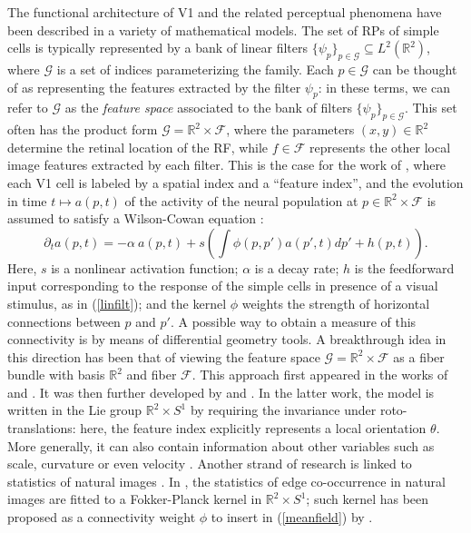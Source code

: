 \documentclass[11pt,oneside,reqno]{amsart}
\begin{document}
 The functional architecture of V1 and the related perceptual phenomena have been described in a variety of mathematical models. The set of RPs of simple cells is typically represented by a bank of linear filters $\{\psi_p\}_{p \in \mathcal{G}} \subseteq L^2(\mathbb{R}^2)$, where $\mathcal{G}$ is a set of indices parameterizing the family. Each $p \in \mathcal{G}$ can be thought of as representing the features extracted by the filter $\psi_p$: in these terms, we can refer to $\mathcal{G}$ as the \emph{feature space} associated to the bank of filters $\{\psi_p\}_{p \in \mathcal{G}}$. This set often has the product form $\mathcal{G}=\mathbb{R}^2\times\mathcal{F}$, where the parameters $(x,y) \in\mathbb{R}^2$ determine the retinal location of the RF, while $f\in\mathcal{F}$ represents the other local image features extracted by each filter. This is the case for the work of \citet{bresscow03}, where each V1 cell is labeled by a spatial index and a ``feature index'', and the evolution in time $t\mapsto a(p,t)$ of the activity of the neural population at $p \in \mathbb{R}^2\times \mathcal{F}$ is assumed to satisfy a Wilson-Cowan equation \citep{wilcow}:
 \begin{equation}\label{meanfield}
  \partial_t a(p,t) = -\alpha \: a(p,t) + s\left(\int \phi(p,p')a(p',t)dp' + h(p,t)\right).
 \end{equation}
 Here, $s$ is a nonlinear activation function; $\alpha$ is a decay rate; $h$ is the feedforward input corresponding to the response of the simple cells in presence of a visual stimulus, as in (\ref{linfilt}); and the kernel $\phi$ weights the strength of horizontal connections between $p$ and $p'$. A possible way to obtain a measure of this connectivity is by means of differential geometry tools. A breakthrough idea in this direction has been that of viewing the feature space $\mathcal{G}=\mathbb{R}^2\times\mathcal{F}$ as a fiber bundle with basis $\mathbb{R}^2$ and fiber $\mathcal{F}$. This approach first appeared in the works of \citet{koenderink} and \citet{hoffman}. It was then further developed by \citet{petitond} and \citet{cs06}. In the latter work, the model is written in the Lie group $\mathbb{R}^2 \times S^1$ by requiring the invariance under roto-translations: here, the feature index explicitly represents a local orientation $\theta$. More generally, it can also contain information about other variables such as scale, curvature or even velocity \cite[see e.g.][]{symplectic,abbfav,bccs}. Another strand of research is linked to statistics of natural images \citep[see e.g.][]{augzuck,kruger,sigman,edge-stat}. In \citet{edge-stat}, the statistics of edge co-occurrence in natural images are fitted to a Fokker-Planck kernel in $\mathbb{R}^2 \times S^1$; such kernel has been proposed as a connectivity weight $\phi$ to insert in (\ref{meanfield}) by \citet{perceptual}. 
 
\end{document}
